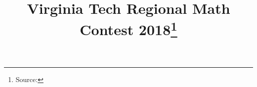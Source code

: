 \documentclass[10pt]{article}
\begin{document}
\title{Virginia Tech Regional Math Contest 2018\footnote{Source: \source}}
\author{\vspace{-2ex}}
\date{\vspace{-6ex}} %
\maketitle







\end{document}
